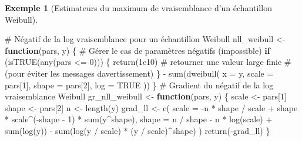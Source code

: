 \documentclass[
  11pt,
  letterpaper,
]{scrbook}
\newenvironment{Shaded}{\begin{snugshade}}{\end{snugshade}}
\newcommand{\AttributeTok}[1]{\textcolor[rgb]{0.40,0.45,0.13}{#1}}
\newcommand{\CommentTok}[1]{\textcolor[rgb]{0.37,0.37,0.37}{#1}}
\newcommand{\ConstantTok}[1]{\textcolor[rgb]{0.56,0.35,0.01}{#1}}
\newcommand{\ControlFlowTok}[1]{\textcolor[rgb]{0.00,0.23,0.31}{\textbf{#1}}}
\newcommand{\DecValTok}[1]{\textcolor[rgb]{0.68,0.00,0.00}{#1}}
\newcommand{\FloatTok}[1]{\textcolor[rgb]{0.68,0.00,0.00}{#1}}
\newcommand{\FunctionTok}[1]{\textcolor[rgb]{0.28,0.35,0.67}{#1}}
\newcommand{\NormalTok}[1]{\textcolor[rgb]{0.00,0.23,0.31}{#1}}
\newcommand{\OtherTok}[1]{\textcolor[rgb]{0.00,0.23,0.31}{#1}}
\newcommand{\SpecialCharTok}[1]{\textcolor[rgb]{0.37,0.37,0.37}{#1}}
\theoremstyle{plain}
\theoremstyle{plain}
\theoremstyle{definition}
\newtheorem{example}{Exemple}[chapter]
\theoremstyle{definition}
\theoremstyle{remark}
\begin{document}
\begin{example}[Estimateurs du maximum de vraisemblance d'un échantillon
Weibull]
\begin{Shaded}
\begin{Highlighting}[]
\CommentTok{\# Négatif de la log vraisemblance pour un échantillon Weibull}
\NormalTok{nll\_weibull }\OtherTok{\textless{}{-}} \ControlFlowTok{function}\NormalTok{(pars, y) \{}
  \CommentTok{\# Gérer le cas de paramètres négatifs (impossible)}
  \ControlFlowTok{if}\NormalTok{ (}\FunctionTok{isTRUE}\NormalTok{(}\FunctionTok{any}\NormalTok{(pars }\SpecialCharTok{\textless{}=} \DecValTok{0}\NormalTok{))) \{}
    \FunctionTok{return}\NormalTok{(}\FloatTok{1e10}\NormalTok{) }\CommentTok{\# retourner une valeur large finie}
\CommentTok{\# (pour éviter les messages d\textquotesingle{}avertissement)}
\NormalTok{  \}}
  \SpecialCharTok{{-}} \FunctionTok{sum}\NormalTok{(}\FunctionTok{dweibull}\NormalTok{(}
    \AttributeTok{x =}\NormalTok{ y,}
    \AttributeTok{scale =}\NormalTok{ pars[}\DecValTok{1}\NormalTok{],}
    \AttributeTok{shape =}\NormalTok{ pars[}\DecValTok{2}\NormalTok{],}
    \AttributeTok{log =} \ConstantTok{TRUE}
\NormalTok{  ))}
\NormalTok{\}}
\CommentTok{\# Gradient du négatif de la log vraisemblance Weibull}
\NormalTok{gr\_nll\_weibull }\OtherTok{\textless{}{-}} \ControlFlowTok{function}\NormalTok{(pars, y) \{}
\NormalTok{  scale }\OtherTok{\textless{}{-}}\NormalTok{ pars[}\DecValTok{1}\NormalTok{]}
\NormalTok{  shape }\OtherTok{\textless{}{-}}\NormalTok{ pars[}\DecValTok{2}\NormalTok{]}
\NormalTok{  n }\OtherTok{\textless{}{-}} \FunctionTok{length}\NormalTok{(y)}
\NormalTok{  grad\_ll }\OtherTok{\textless{}{-}} \FunctionTok{c}\NormalTok{(}
    \AttributeTok{scale =} \SpecialCharTok{{-}}\NormalTok{n }\SpecialCharTok{*}\NormalTok{ shape }\SpecialCharTok{/}\NormalTok{ scale }\SpecialCharTok{+}\NormalTok{ shape }\SpecialCharTok{*}\NormalTok{ scale}\SpecialCharTok{\^{}}\NormalTok{(}\SpecialCharTok{{-}}\NormalTok{shape }\SpecialCharTok{{-}} \DecValTok{1}\NormalTok{) }\SpecialCharTok{*} \FunctionTok{sum}\NormalTok{(y}\SpecialCharTok{\^{}}\NormalTok{shape),}
    \AttributeTok{shape =}\NormalTok{ n }\SpecialCharTok{/}\NormalTok{ shape }\SpecialCharTok{{-}}\NormalTok{ n }\SpecialCharTok{*} \FunctionTok{log}\NormalTok{(scale) }\SpecialCharTok{+} \FunctionTok{sum}\NormalTok{(}\FunctionTok{log}\NormalTok{(y)) }\SpecialCharTok{{-}}
      \FunctionTok{sum}\NormalTok{(}\FunctionTok{log}\NormalTok{(y }\SpecialCharTok{/}\NormalTok{ scale) }\SpecialCharTok{*}\NormalTok{ (y }\SpecialCharTok{/}\NormalTok{ scale)}\SpecialCharTok{\^{}}\NormalTok{shape)}
\NormalTok{  )}
  \FunctionTok{return}\NormalTok{(}\SpecialCharTok{{-}}\NormalTok{grad\_ll)}
\NormalTok{\}}


\end{Highlighting}
\end{Shaded}
\end{example}
\end{document}
